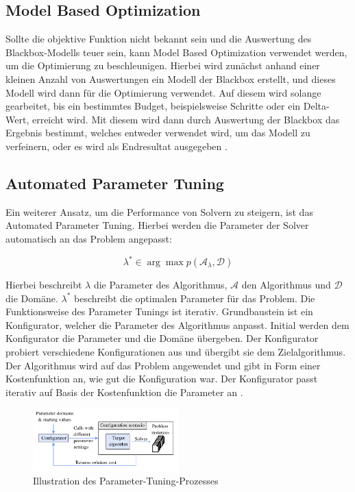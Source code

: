 \subsection{Model Based Optimization}
\label{sec:Model-Based-Optimization}

Sollte die objektive Funktion nicht bekannt sein und die Auswertung des
Blackbox-Modells teuer sein, kann Model Based Optimization verwendet werden, um
die Optimierung zu beschleunigen. Hierbei wird zunächst anhand einer kleinen
Anzahl von Auswertungen ein Modell der Blackbox erstellt, und dieses Modell wird
dann für die Optimierung verwendet. Auf diesem wird solange gearbeitet, bis ein
bestimmtes Budget, beispielsweise Schritte oder ein Delta-Wert, erreicht wird.
Mit diesem wird dann durch Auswertung der Blackbox das Ergebnis bestimmt,
welches entweder verwendet wird, um das Modell zu verfeinern, oder es wird als
Endresultat ausgegeben \cite[4]{bisch18pr}. 


\subsection{Automated Parameter Tuning}
\label{sec:Automated-Parameter-Tuning}

Ein weiterer Ansatz, um die Performance von Solvern zu steigern, ist das
Automated Parameter Tuning. Hierbei werden die Parameter der Solver automatisch
an das Problem angepasst:

\[
\lambda^{*} \in \arg\max p(\mathcal{A}_{\lambda}, \mathcal{D})
\]

Hierbei beschreibt \(\lambda\) die Parameter des Algorithmus, \(\mathcal{A}\)
den Algorithmus und \(\mathcal{D}\) die Domäne. \(\lambda^{*}\) beschreibt die
optimalen Parameter für das Problem. Die Funktionsweise des Parameter Tunings
ist iterativ. Grundbaustein ist ein Konfigurator, welcher die Parameter des
Algorithmus anpasst. Initial werden dem Konfigurator die Parameter und die
Domäne übergeben. Der Konfigurator probiert verschiedene Konfigurationen aus und
übergibt sie dem Zielalgorithmus. Der Algorithmus wird auf das Problem
angewendet und gibt in Form einer Kostenfunktion an, wie gut die Konfiguration
war. Der Konfigurator passt iterativ auf Basis der Kostenfunktion die Parameter
an \cite[31-38]{kotth23pr}.

\begin{figure}[h]
    \centering
    \includegraphics[width=0.5\textwidth]{figures/Automated Parameter Tuning [kotth23pr].PNG}
    \caption{Illustration des Parameter-Tuning-Prozesses \cite[34]{kotth23pr}}
    \label{fig:bild}
\end{figure}


